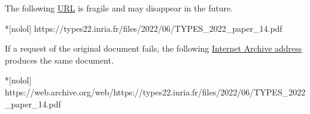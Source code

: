 The following \href{https://types22.inria.fr/files/2022/06/TYPES_2022_paper_14.pdf}{URL} is fragile and may disappear in the future.
\begin{center}
\begin{minipage}{\textwidth}
\begin{cmdlisting}*[nolol]
https://types22.inria.fr/files/2022/06/TYPES_2022_paper_14.pdf
\end{cmdlisting}
\end{minipage}
\end{center}

If a request of the original document fails,
the following \href{https://web.archive.org/web/https://types22.inria.fr/files/2022/06/TYPES_2022_paper_14.pdf}
{Internet Archive address} produces the same document.
\begin{center}
\begin{minipage}{\textwidth}
\begin{cmdlisting}*[nolol]
https://web.archive.org/web/https://types22.inria.fr/files/2022/06/TYPES_2022_paper_14.pdf
\end{cmdlisting}
\end{minipage}
\end{center}